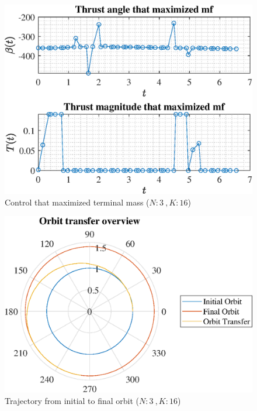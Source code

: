 \documentclass[]{article}
\begin{document}
	\begin{figure}
		\centering
		\includegraphics[scale=0.75]{control_N3_K16_C2_mf.eps}
		\caption{Control that maximized terminal mass (\(N:3\ , K:16\))}
		\label{fig:control_N3_K16_C2_mf}
	\end{figure}
	\begin{figure}
		\centering
		\includegraphics[scale=0.75]{orbit_N3_K16_C2_mf.eps}
		\caption{Trajectory from initial to final orbit (\(N:3\ , K:16\))}
		\label{fig:orbit_N3_K16_C2_mf}
	\end{figure}
\end{document}
